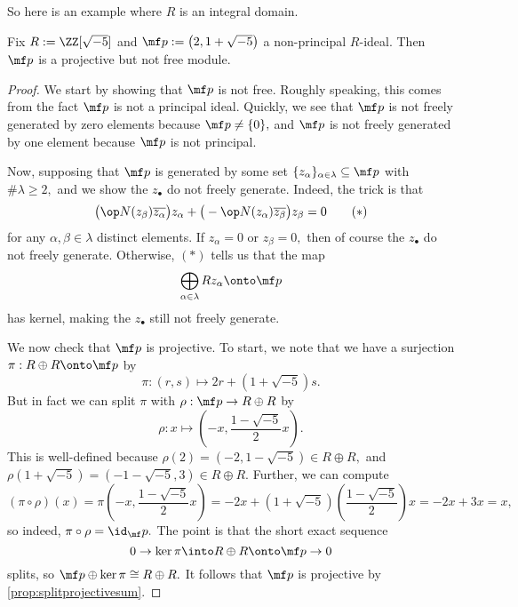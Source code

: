 So here is an example where $R$ is an integral domain.
\begin{exercise}
	Fix $R:=\ZZ[\sqrt{-5}]$ and $\mf p:=\left(2,1+\sqrt{-5}\right)$ a non-principal $R$-ideal. Then $\mf p$ is a projective but not free module.
\end{exercise}
\begin{proof}
	We start by showing that $\mf p$ is not free. Roughly speaking, this comes from the fact $\mf p$ is not a principal ideal. Quickly, we see that $\mf p$ is not freely generated by zero elements because $\mf p\ne\{0\},$ and $\mf p$ is not freely generated by one element because $\mf p$ is not principal.
	
	Now, supposing that $\mf p$ is generated by some set $\{z_\alpha\}_{\alpha\in\lambda}\subseteq\mf p$ with $\#\lambda\ge2,$ and we show the $z_\bullet$ do not freely generate. Indeed, the trick is that
	\[\big(\op N(z_\beta)\overline{z_\alpha}\big)z_\alpha+\big(-\op N(z_\alpha)\overline{z_\beta}\big)z_\beta=0\tag{$*$}\]
	for any $\alpha,\beta\in\lambda$ distinct elements. If $z_\alpha=0$ or $z_\beta=0,$ then of course the $z_\bullet$ do not freely generate. Otherwise, $(*)$ tells us that the map
	\[\bigoplus_{\alpha\in\lambda}Rz_\alpha\onto\mf p\]
	has kernel, making the $z_\bullet$ still not freely generate.

	We now check that $\mf p$ is projective. To start, we note that we have a surjection $\pi:R\oplus R\onto\mf p$ by
	\[\pi:(r,s)\mapsto2r+\left(1+\sqrt{-5}\right)s.\]
	But in fact we can split $\pi$ with $\rho:\mf p\to R\oplus R$ by
	\[\rho:x\mapsto\left(-x,\frac{1-\sqrt{-5}}2x\right).\]
	This is well-defined because $\rho(2)=\left(-2,1-\sqrt{-5}\right)\in R\oplus R,$ and $\rho\left(1+\sqrt{-5}\right)=\left(-1-\sqrt{-5},3\right)\in R\oplus R.$ Further, we can compute
	\[(\pi\circ\rho)(x)=\pi\left(-x,\frac{1-\sqrt{-5}}2x\right)=-2x+\left(1+\sqrt{-5}\right)\left(\frac{1-\sqrt{-5}}2\right)x=-2x+3x=x,\]
	so indeed, $\pi\circ\rho=\id_\mf p.$ The point is that the short exact sequence
	\[0\to\ker\pi\into R\oplus R\onto\mf p\to 0\]
	splits, so $\mf p\oplus\ker\pi\cong R\oplus R.$ It follows that $\mf p$ is projective by \autoref{prop:splitprojectivesum}.
\end{proof}

